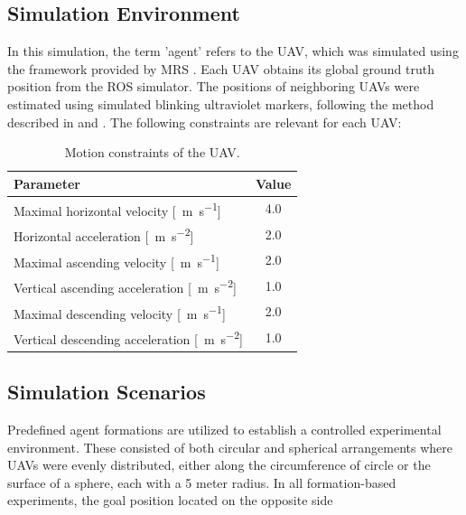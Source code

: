     \subsection{Simulation Environment}
        In this simulation, the term 'agent' refers to the \ac{UAV}, which was simulated using the framework provided by \ac{MRS} \cite{mrs_uav_system}.
        Each \ac{UAV} obtains its global ground truth position from the ROS simulator.
        The positions of neighboring \ac{UAV}s were estimated using simulated blinking ultraviolet markers, following the method described in \cite{uvdd1} and \cite{uvdar_package}.
        The following constraints are relevant for each \ac{UAV}:
        \begin{table}[h]
            \centering
            \renewcommand{\arraystretch}{1.1}
            \begin{tabular}{|l|c|}
                \hline
                \textbf{Parameter} & \textbf{Value} \\ \hline
                    Maximal horizontal velocity [\SI{}{\meter\per\second}] & 4.0 \\ \hline
                    Horizontal acceleration [\SI{}{\meter\per\second\squared}] & 2.0 \\ \hline
                    Maximal ascending velocity [\SI{}{\meter\per\second}] & 2.0 \\ \hline
                    Vertical ascending acceleration [\SI{}{\meter\per\second\squared}] & 1.0 \\ \hline
                    Maximal descending velocity [\SI{}{\meter\per\second}] & 2.0 \\ \hline
                    Vertical descending acceleration [\SI{}{\meter\per\second\squared}] & 1.0 \\ \hline
                \end{tabular}
                \caption{Motion constraints of the \ac{UAV}.}
            \label{tab:uav_constraints}
        \end{table}
        
    \subsection{Simulation Scenarios}
        Predefined agent formations are utilized to establish a controlled experimental environment.
        These consisted of both circular and spherical arrangements where \ac{UAVs} were evenly distributed, either along the circumference of circle or the surface of a sphere, each with a 5 meter radius.
        In all formation-based experiments, the goal position located on the opposite side

